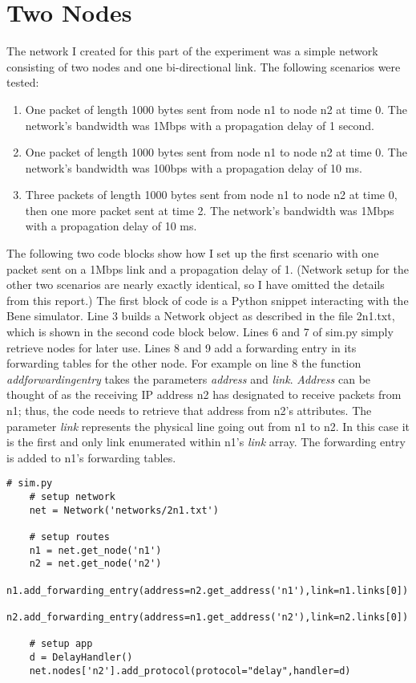 \documentclass[11pt]{article}
\begin{document}
\section{Two Nodes}

The network I created for this part of the experiment was a simple network consisting of two nodes and one bi-directional link. The following scenarios were tested:

\begin{enumerate}

\item One packet of length 1000 bytes sent from node n1 to node n2 at time 0. The network's bandwidth was 1Mbps with a propagation delay of 1 second.

\item One packet of length 1000 bytes sent from node n1 to node n2 at time 0. The network's bandwidth was 100bps with a propagation delay of 10 ms.

\item Three packets of length 1000 bytes sent from node n1 to node n2 at time 0, then one more packet sent at time 2. The network's bandwidth was 1Mbps with a propagation delay of 10 ms.

\end{enumerate}

The following two code blocks show how I set up the first scenario with one packet sent on a 1Mbps link and a propagation delay of 1. (Network setup for the other two scenarios are nearly exactly identical, so I have omitted the details from this report.) The first block of code is a Python snippet interacting with the Bene simulator. Line 3 builds a Network object as described in the file 2n1.txt, which is shown in the second code block below. Lines 6 and 7 of sim.py simply retrieve nodes for later use. Lines 8 and 9 add a forwarding entry in its forwarding tables for the other node. For example on line 8 the function \emph{add\textunderscore forwarding\textunderscore entry} takes the parameters \emph{address} and \emph{link}. \emph{Address} can be thought of as the receiving IP address n2 has designated to receive packets from n1; thus, the code needs to retrieve that address from n2's attributes. The parameter \emph{link} represents the physical line going out from n1 to n2. In this case it is the first and only link enumerated within n1's \emph{link} array. The forwarding entry is added to n1's forwarding tables.

\begin{lstlisting}
# sim.py
    # setup network
    net = Network('networks/2n1.txt')

    # setup routes
    n1 = net.get_node('n1')
    n2 = net.get_node('n2')
    n1.add_forwarding_entry(address=n2.get_address('n1'),link=n1.links[0])
    n2.add_forwarding_entry(address=n1.get_address('n2'),link=n2.links[0])

    # setup app
    d = DelayHandler()
    net.nodes['n2'].add_protocol(protocol="delay",handler=d)
\end{lstlisting}
\end{document}
